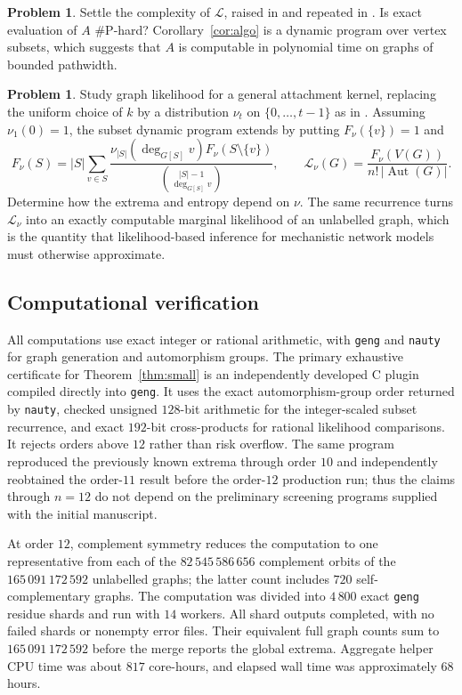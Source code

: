 \documentclass[11pt]{article}
\theoremstyle{definition}
\newtheorem{problem}[theorem]{Problem}
\DeclareMathOperator{\Aut}{Aut}
\newcommand{\Lk}{\mathcal{L}}
\newcommand{\bin}[2]{\binom{#1}{#2}}
\begin{document}
\begin{problem}\label{prob:complexity}
Settle the complexity of $\Lk$, raised in \cite{BMS14} and repeated in \cite{DMS18}. Is exact evaluation of $A$ $\#\mathrm P$-hard? Corollary~\ref{cor:algo} is a dynamic program over vertex subsets, which suggests that $A$ is computable in polynomial time on graphs of bounded pathwidth.
\end{problem}

\begin{problem}
Study graph likelihood for a general attachment kernel, replacing the uniform
choice of $k$ by a distribution $\nu_t$ on $\{0,\dots,t-1\}$ as in
\cite{JS13}.  Assuming $\nu_1(0)=1$, the subset dynamic program extends by
putting $F_\nu(\{v\})=1$ and
\[
F_\nu(S)=\lvert S\rvert\sum_{v\in S}
\frac{\nu_{\lvert S\rvert}(\deg_{G[S]}v)F_\nu(S\setminus\{v\})}
{\bin{\lvert S\rvert-1}{\deg_{G[S]}v}},
\qquad
\Lk_\nu(G)=\frac{F_\nu(V(G))}{n!\,\lvert\Aut(G)\rvert}.
\]
Determine how the extrema and entropy depend on $\nu$.  The same recurrence
turns $\Lk_\nu$ into an exactly computable marginal likelihood of an
unlabelled graph, which is the quantity that likelihood-based inference for
mechanistic network models must otherwise approximate.
\end{problem}

\subsection*{Computational verification}

All computations use exact integer or rational arithmetic, with \texttt{geng}
and \texttt{nauty} \cite{nauty} for graph generation and automorphism groups.
The primary exhaustive certificate for Theorem~\ref{thm:small} is an
independently developed C plugin compiled directly into \texttt{geng}.  It
uses the exact automorphism-group order returned by \texttt{nauty}, checked
unsigned $128$-bit arithmetic for the integer-scaled subset recurrence, and
exact $192$-bit cross-products for rational likelihood comparisons.  It
rejects orders above $12$ rather than risk overflow.  The same program
reproduced the previously known extrema through order $10$ and independently
reobtained the order-$11$ result before the order-$12$ production run; thus the
claims through $n=12$ do not depend on
the preliminary screening programs supplied with the initial manuscript.

At order $12$, complement symmetry reduces the computation to one
representative from each of the $82\,545\,586\,656$ complement orbits of the
$165\,091\,172\,592$ unlabelled graphs; the latter count includes $720$
self-complementary graphs.  The computation was divided into $4\,800$ exact
\texttt{geng} residue shards and run with $14$ workers.  All shard outputs
completed, with no failed shards or nonempty error files.  Their equivalent
full graph counts sum to $165\,091\,172\,592$ before the merge reports the
global extrema.  Aggregate helper CPU time was about $817$ core-hours, and
elapsed wall time was approximately $68$ hours.
\end{document}
